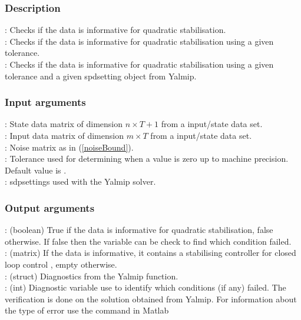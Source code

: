 \subsubsection*{Description}
: Checks if the data is informative for quadratic stabilisation. \\
: Checks if the data is informative for quadratic stabilisation using a given tolerance. \\
: Checks if the data is informative for quadratic stabilisation using a given tolerance and a given spdsetting object from Yalmip.

\subsubsection*{Input arguments}
\textbf{}: State data matrix of dimension $n \times T+1$ from a input/state data set.\\
\textbf{}: Input data matrix of dimension $m \times T$ from a input/state data set.\\
\textbf{}: Noise matrix as in (\ref{noiseBound}). \\ 
\textbf{}: Tolerance used for determining when a value is zero up to machine precision. Default value is .\\
\textbf{}: sdpsettings used with the Yalmip solver.

\subsubsection*{Output arguments}
\textbf{}: (boolean) True if the data is informative for quadratic stabilisation, false otherwise. If false then the  variable can be check to find which condition failed. \\
\textbf{}: (matrix) If the data is informative, it contains a stabilising controller  for closed loop control , empty otherwise.\\
\textbf{}: (struct) Diagnostics from the Yalmip  function. \\
\textbf{}: (int) Diagnostic variable use to identify which conditions (if any) failed. The verification is done on the solution obtained from Yalmip. For information about the type of error use the  command in Matlab

